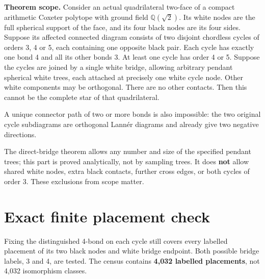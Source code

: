 \documentclass[
  10pt,
]{report}
\begin{document}
\textbf{Theorem scope.} Consider an actual quadrilateral two-face of a
compact arithmetic Coxeter polytope with ground field
\(\mathbb Q(\sqrt2)\). Its white nodes are the full spherical support of
the face, and its four black nodes are its four sides. Suppose its
affected connected diagram consists of two disjoint chordless cycles of
orders 3, 4 or 5, each containing one opposite black pair. Each cycle
has exactly one bond 4 and all its other bonds 3. At least one cycle has
order 4 or 5. Suppose the cycles are joined by a single white bridge,
allowing arbitrary pendant spherical white trees, each attached at
precisely one white cycle node. Other white components may be
orthogonal. There are no other contacts. Then this cannot be the
complete star of that quadrilateral.

A unique connector path of two or more bonds is also impossible: the two
original cycle subdiagrams are orthogonal Lannér diagrams and already
give two negative directions.

The direct-bridge theorem allows any number and size of the specified
pendant trees; this part is proved analytically, not by sampling trees.
It does \textbf{not} allow shared white nodes, extra black contacts,
further cross edges, or both cycles of order 3. These exclusions from
scope matter.

\section{Exact finite placement
check}\label{exact-finite-placement-check}

Fixing the distinguished 4-bond on each cycle still covers every
labelled placement of its two black nodes and white bridge endpoint.
Both possible bridge labels, 3 and 4, are tested. The census contains
\textbf{4,032 labelled placements}, not 4,032 isomorphism classes.
\end{document}
